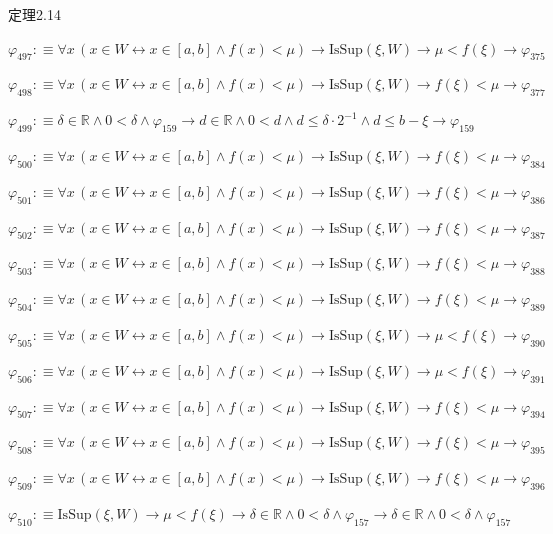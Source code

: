 \begin{fullproof}{定理2.14}
\begin{abbrevlist}
\item $\varphi_{497} :\equiv \forall x\,(x \in W \leftrightarrow x \in [a,b] \land f(x) < \mu) \to \mathrm{IsSup}(\xi,W) \to \mu < f(\xi) \to \varphi_{375}$
\item $\varphi_{498} :\equiv \forall x\,(x \in W \leftrightarrow x \in [a,b] \land f(x) < \mu) \to \mathrm{IsSup}(\xi,W) \to f(\xi) < \mu \to \varphi_{377}$
\item $\varphi_{499} :\equiv \delta \in \mathbb{R} \land 0 < \delta \land \varphi_{159} \to d \in \mathbb{R} \land 0 < d \land d \leq \delta \cdot 2^{-1} \land d \leq b - \xi \to \varphi_{159}$
\item $\varphi_{500} :\equiv \forall x\,(x \in W \leftrightarrow x \in [a,b] \land f(x) < \mu) \to \mathrm{IsSup}(\xi,W) \to f(\xi) < \mu \to \varphi_{384}$
\item $\varphi_{501} :\equiv \forall x\,(x \in W \leftrightarrow x \in [a,b] \land f(x) < \mu) \to \mathrm{IsSup}(\xi,W) \to f(\xi) < \mu \to \varphi_{386}$
\item $\varphi_{502} :\equiv \forall x\,(x \in W \leftrightarrow x \in [a,b] \land f(x) < \mu) \to \mathrm{IsSup}(\xi,W) \to f(\xi) < \mu \to \varphi_{387}$
\item $\varphi_{503} :\equiv \forall x\,(x \in W \leftrightarrow x \in [a,b] \land f(x) < \mu) \to \mathrm{IsSup}(\xi,W) \to f(\xi) < \mu \to \varphi_{388}$
\item $\varphi_{504} :\equiv \forall x\,(x \in W \leftrightarrow x \in [a,b] \land f(x) < \mu) \to \mathrm{IsSup}(\xi,W) \to f(\xi) < \mu \to \varphi_{389}$
\item $\varphi_{505} :\equiv \forall x\,(x \in W \leftrightarrow x \in [a,b] \land f(x) < \mu) \to \mathrm{IsSup}(\xi,W) \to \mu < f(\xi) \to \varphi_{390}$
\item $\varphi_{506} :\equiv \forall x\,(x \in W \leftrightarrow x \in [a,b] \land f(x) < \mu) \to \mathrm{IsSup}(\xi,W) \to \mu < f(\xi) \to \varphi_{391}$
\item $\varphi_{507} :\equiv \forall x\,(x \in W \leftrightarrow x \in [a,b] \land f(x) < \mu) \to \mathrm{IsSup}(\xi,W) \to f(\xi) < \mu \to \varphi_{394}$
\item $\varphi_{508} :\equiv \forall x\,(x \in W \leftrightarrow x \in [a,b] \land f(x) < \mu) \to \mathrm{IsSup}(\xi,W) \to f(\xi) < \mu \to \varphi_{395}$
\item $\varphi_{509} :\equiv \forall x\,(x \in W \leftrightarrow x \in [a,b] \land f(x) < \mu) \to \mathrm{IsSup}(\xi,W) \to f(\xi) < \mu \to \varphi_{396}$
\item $\varphi_{510} :\equiv \mathrm{IsSup}(\xi,W) \to \mu < f(\xi) \to \delta \in \mathbb{R} \land 0 < \delta \land \varphi_{157} \to \delta \in \mathbb{R} \land 0 < \delta \land \varphi_{157}$

\end{abbrevlist}
\end{fullproof}

